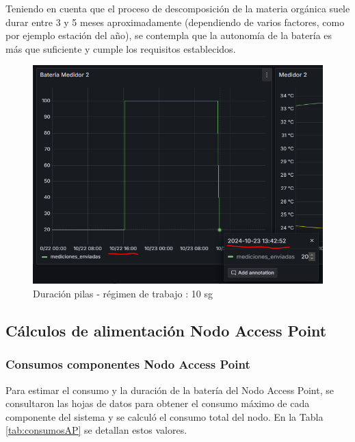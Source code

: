 Teniendo en cuenta que el proceso de descomposición de la materia orgánica suele durar entre 3 y 5 meses aproximadamente (dependiendo de varios factores, como por ejemplo estación del año), se contempla que la autonomía de la batería es más que suficiente y cumple los requisitos establecidos.

\begin{figure}[H]
	\centering
	\includegraphics[scale=0.9]{./Figures/Pruebas/duracion_pila.png}
	\caption{Duración pilas - régimen de trabajo : 10 sg}
	\label{fig:PruebaBateria}
\end{figure}



\subsection{Cálculos de alimentación Nodo Access Point}
\subsubsection{Consumos componentes Nodo Access Point}

Para estimar el consumo y la duración de la batería del Nodo Access Point, se consultaron las hojas de datos para obtener el consumo máximo de cada componente del sistema y se calculó el consumo total del nodo. En la Tabla \ref{tab:consumosAP} se detallan estos valores.

